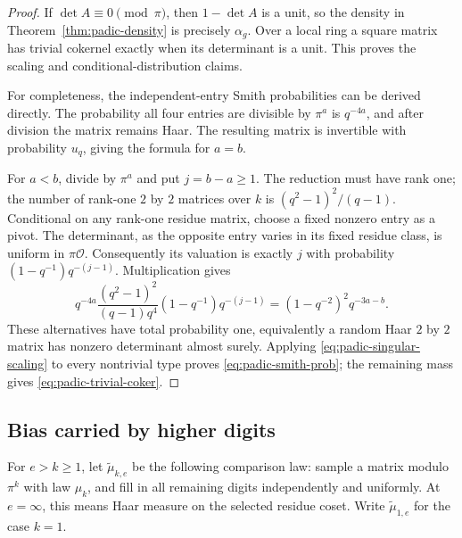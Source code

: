 \begin{proof}
If $\det A\equiv0\pmod\pi$, then $1-\det A$ is a unit, so the density
in Theorem~\ref{thm:padic-density} is precisely $\alpha_g$. Over a local
ring a square matrix has trivial cokernel exactly when its determinant
is a unit. This proves the scaling and conditional-distribution claims.

For completeness, the independent-entry Smith probabilities can be
derived directly. The probability all four entries are divisible by
$\pi^a$ is $q^{-4a}$, and after division the matrix remains Haar.
The resulting matrix is invertible with probability $u_q$, giving
the formula for $a=b$.

For $a<b$, divide by $\pi^a$ and put $j=b-a\geq1$. The reduction must
have rank one; the number of rank-one $2$ by $2$ matrices over $k$ is
$(q^2-1)^2/(q-1)$. Conditional on any rank-one residue matrix, choose
a fixed nonzero entry as a pivot. The determinant, as the opposite
entry varies in its fixed residue class, is uniform in $\pi\mathcal O$.
Consequently its valuation is exactly $j$ with probability
$(1-q^{-1})q^{-(j-1)}$. Multiplication gives
\[
 q^{-4a}\frac{(q^2-1)^2}{(q-1)q^4}
 (1-q^{-1})q^{-(j-1)}
 =(1-q^{-2})^2q^{-3a-b}.
\]
These alternatives have total probability one, equivalently a random
Haar $2$ by $2$ matrix has nonzero determinant almost surely. Applying
\eqref{eq:padic-singular-scaling} to every nontrivial type proves
\eqref{eq:padic-smith-prob}; the remaining mass gives
\eqref{eq:padic-trivial-coker}.
\end{proof}

\subsection{Bias carried by higher digits}

For $e>k\geq1$, let $\widetilde\mu_{k,e}$ be the following comparison
law: sample a matrix modulo $\pi^k$ with law $\mu_k$, and fill in all
remaining digits independently and uniformly. At $e=\infty$, this
means Haar measure on the selected residue coset. Write
$\widetilde\mu_{1,e}$ for the case $k=1$.

